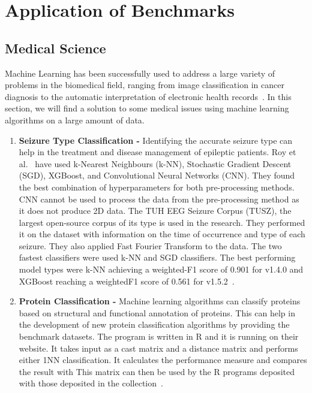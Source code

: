 \documentclass[a4paper,UKenglish,cleveref, autoref, thm-restate]{lipics-v2021}
\begin{document}
\section{Application of Benchmarks}
\label{applications of Benchmarks}
\subsection{Medical Science }
\label{Medical science}
Machine Learning has been successfully used to address a large variety of problems in the biomedical field, ranging from image classification in cancer diagnosis to the automatic interpretation of electronic health records~\cite{seizure}. In this section, we will find a solution to some medical issues using machine learning algorithms on a large amount of data.
\begin{enumerate}
    \item \textbf{Seizure Type Classification - }
Identifying the accurate seizure type can help in the treatment and disease management of epileptic patients. Roy et al.~\cite{seizure} have used k-Nearest Neighbours (k-NN), Stochastic Gradient Descent (SGD), XGBoost, and Convolutional Neural Networks (CNN). They found the best combination of hyperparameters for both pre-processing methods.  CNN cannot be used to
process the data from the pre-processing method as it
does not produce 2D data. The TUH EEG Seizure Corpus (TUSZ), the largest open-source corpus of its type is used in the research. 
They performed it on the dataset with information on the time of occurrence and type of each seizure. 
They also applied Fast Fourier Transform to the data.
The two fastest classifiers were used k-NN and SGD classifiers.
The best performing model types were k-NN achieving a weighted-F1 score of 0.901 for v1.4.0 and XGBoost reaching a weightedF1 score of 0.561 for v1.5.2~\cite{seizure}.    

\item \textbf{Protein Classification -}
\label{Protein Classification}
Machine learning algorithms can classify proteins based on structural and functional annotation of proteins. This can help in the development of new protein classification algorithms by providing the benchmark datasets. The program is written in R and it is running on their website. It takes input as a cast matrix and a distance matrix and performs either 1NN classification. 
It calculates the performance measure and compares the result with 
This matrix can then be used by the R programs deposited with those deposited in the collection~\cite{protein}.
\end{enumerate}
\end{document}
